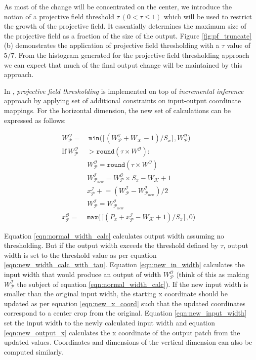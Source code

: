 As most of the change will be concentrated on the center, we introduce the notion of a projective field threshold $\tau ~ (0 < \tau \leq 1)$ which will be used to restrict the growth of the projective field.
It essentially determines the maximum size of the projective field as a fraction of the size of the output.
Figure \ref{fig:pf_truncate} (b) demonstrates the application of projective field thresholding with a $\tau$ value of $5/7$.
From the histogram generated for the projective field thresholding approach we can expect that much of the final output change will be maintained by this approach.

In \system, \textit{projective field thresholding} is implemented on top of \textit{incremental inference} approach by applying set of additional constraints on input-output coordinate mappings. For the horizontal dimension, the new set of calculations can be expressed as follows:

\begin{align}
\label{eqn:normal_width_calc}
W^\mathcal{O}_\mathcal{P} = &~ \texttt{min}\big(\lceil (W^\mathcal{I}_\mathcal{P} + W_\mathcal{K} - 1)/S_x \rceil, W^\mathcal{O}_\mathcal{P}\big)\\
\label{eqn:check_tau}
\text{If}~ W_\mathcal{P}^\mathcal{O} & > \texttt{round}(\tau \times W^\mathcal{O}):\\
\label{eqn:new_width_calc_with_tau}
& W^\mathcal{O}_\mathcal{P} = \texttt{round}(\tau \times W^\mathcal{O})\\
\label{eqn:new_in_width}
& W^\mathcal{I}_{\mathcal{P}_{new}} = W^\mathcal{O}_{\mathcal{P}} \times S_x - W_{\mathcal{K}} + 1\\
\label{eqn:new_x_coord}
& x^{\mathcal{I}}_\mathcal{P} \mathrel{+}= (W^\mathcal{I}_\mathcal{P} - W^\mathcal{I}_{\mathcal{P}_{new}})/2\\
\label{eqn:new_input_width}
& W^\mathcal{I}_{\mathcal{P}} = W^\mathcal{I}_{\mathcal{P}_{new}}\\
\label{eqn:new_output_x}
x^\mathcal{O}_\mathcal{P} = & \texttt{max}\big(\lceil (P_x + x^\mathcal{I}_\mathcal{P} - W_\mathcal{K} + 1)/S_x \rceil, 0\big)
\end{align}

Equation \ref{eqn:normal_width_calc} calculates output width assuming no thresholding. But if the output width exceeds the threshold defined by $\tau$, output width is set to the threshold value as per equation \ref{eqn:new_width_calc_with_tau}.
Equation \ref{eqn:new_in_width} calculates the input width that would produce an output of width $W^\mathcal{O}_\mathcal{P}$ (think of this as making $W^{\mathcal{I}}_{\mathcal{P}}$ the subject of equation \ref{eqn:normal_width_calc}).
If the new input width is smaller than the original input width, the starting x coordinate should be updated as per equation \ref{eqn:new_x_coord} such that the updated coordinates correspond to a center crop from the original.
Equation \ref{eqn:new_input_width} set the input width to the newly calculated input width and equation \ref{eqn:new_output_x} calculates the x coordinate of the output patch from the updated values.
Coordinates and dimensions of the vertical dimension can also be computed similarly.


